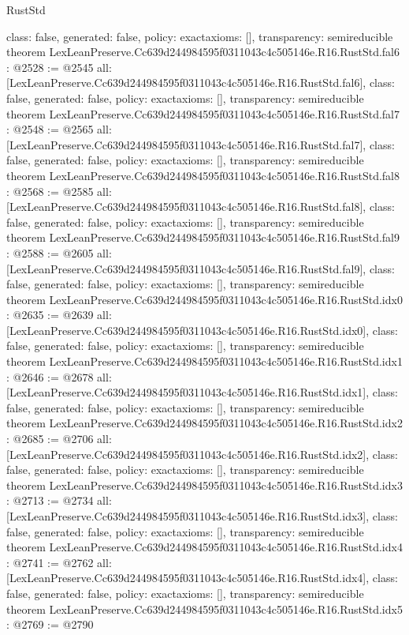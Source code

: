 \begin{lexlean}{RustStd}
\begin{coremodule}
{  class: false,
  generated: false,
  policy: exact{axioms: []},
  transparency: semireducible
}
theorem LexLeanPreserve.Cc639d244984595f0311043c4c505146e.R16.RustStd.fal6 : @2528 := @2545 {
  all: [LexLeanPreserve.Cc639d244984595f0311043c4c505146e.R16.RustStd.fal6],
  class: false,
  generated: false,
  policy: exact{axioms: []},
  transparency: semireducible
}
theorem LexLeanPreserve.Cc639d244984595f0311043c4c505146e.R16.RustStd.fal7 : @2548 := @2565 {
  all: [LexLeanPreserve.Cc639d244984595f0311043c4c505146e.R16.RustStd.fal7],
  class: false,
  generated: false,
  policy: exact{axioms: []},
  transparency: semireducible
}
theorem LexLeanPreserve.Cc639d244984595f0311043c4c505146e.R16.RustStd.fal8 : @2568 := @2585 {
  all: [LexLeanPreserve.Cc639d244984595f0311043c4c505146e.R16.RustStd.fal8],
  class: false,
  generated: false,
  policy: exact{axioms: []},
  transparency: semireducible
}
theorem LexLeanPreserve.Cc639d244984595f0311043c4c505146e.R16.RustStd.fal9 : @2588 := @2605 {
  all: [LexLeanPreserve.Cc639d244984595f0311043c4c505146e.R16.RustStd.fal9],
  class: false,
  generated: false,
  policy: exact{axioms: []},
  transparency: semireducible
}
theorem LexLeanPreserve.Cc639d244984595f0311043c4c505146e.R16.RustStd.idx0 : @2635 := @2639 {
  all: [LexLeanPreserve.Cc639d244984595f0311043c4c505146e.R16.RustStd.idx0],
  class: false,
  generated: false,
  policy: exact{axioms: []},
  transparency: semireducible
}
theorem LexLeanPreserve.Cc639d244984595f0311043c4c505146e.R16.RustStd.idx1 : @2646 := @2678 {
  all: [LexLeanPreserve.Cc639d244984595f0311043c4c505146e.R16.RustStd.idx1],
  class: false,
  generated: false,
  policy: exact{axioms: []},
  transparency: semireducible
}
theorem LexLeanPreserve.Cc639d244984595f0311043c4c505146e.R16.RustStd.idx2 : @2685 := @2706 {
  all: [LexLeanPreserve.Cc639d244984595f0311043c4c505146e.R16.RustStd.idx2],
  class: false,
  generated: false,
  policy: exact{axioms: []},
  transparency: semireducible
}
theorem LexLeanPreserve.Cc639d244984595f0311043c4c505146e.R16.RustStd.idx3 : @2713 := @2734 {
  all: [LexLeanPreserve.Cc639d244984595f0311043c4c505146e.R16.RustStd.idx3],
  class: false,
  generated: false,
  policy: exact{axioms: []},
  transparency: semireducible
}
theorem LexLeanPreserve.Cc639d244984595f0311043c4c505146e.R16.RustStd.idx4 : @2741 := @2762 {
  all: [LexLeanPreserve.Cc639d244984595f0311043c4c505146e.R16.RustStd.idx4],
  class: false,
  generated: false,
  policy: exact{axioms: []},
  transparency: semireducible
}
theorem LexLeanPreserve.Cc639d244984595f0311043c4c505146e.R16.RustStd.idx5 : @2769 := @2790 {
}
\end{coremodule}
\end{lexlean}
